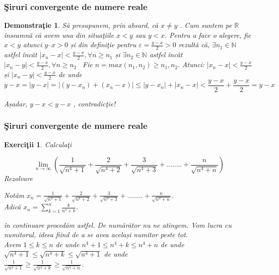 \documentclass{beamer}
\theoremstyle{plain}
\newtheorem{ex}[de]{Exerci\c tii}
\newtheorem{dem}{Demonstra\c tie}
\begin{document}
\frame
{
\frametitle{\c Siruri convergente de numere reale}

\begin{dem}
S\u a presupunem, prin absurd, c\u a \(x \neq  y\) . Cum suntem pe \(\mathbb{R}\) \^ inseamn\u a c\u a avem una din situa\c tiile \(x < y\) sau \(y < x\). Pentru a face o alegere, fie \(x < y\) atunci \(y – x > 0\) și din defini\c tie pentru \(\varepsilon = \frac{y- x}{2}  > 0\) rezult\u a c\u a, 
\(\exists  n_{1} \in \mathbb{N}\) astfel \^ inc\^ at \(\left | x_{n} - x  \right | < \frac{y - x }{2} , \forall n \geq n_{1} \)
și 
\(\exists  n_{2} \in \mathbb{N}\) astfel \^ inc\^ at \(\left | x_{n} - y  \right | < \frac{y - x }{2} , \forall n \geq n_{2}\) 
Fie \(n = max (n _{1}, n_{2}) \geq n_{1}, n_{2}.\) Atunci: 
\(\left | x_{n} - x \right | < \frac{y-x}{2}\) și \(\left | x_{n} - y  \right | <  \frac{y-x}{2}\)
de unde 
\begin{displaymath}
  y-x = \left | y-x \right | = \left | (y-x_{n})+ (x_{n} -x) \right |\leq \left | y-x_{n} \right | + \left | x_{n} - x \right | < \frac{y-x}{2} + \frac{y-x}{2} = y-x
\end{displaymath}

	Așadar, \(y-x < y-x\) , contradic\c tie!
\end{dem}
}
\frame
{
\frametitle{\c Siruri convergente de numere reale}

\begin{ex}
Calcula\c ti 

\begin{displaymath}
  \lim_{n\to\infty }\left ( \frac{1}{\sqrt{n^{4}+1}}+ \frac{2}{\sqrt{n^{4}+2} } +\frac{3}{\sqrt{n^{4}+3}}+........+\frac{n}{\sqrt{n^{4}+n}}  \right )
\end{displaymath}
Rezolvare

Not\u am \(x_{n}= \frac{1}{\sqrt{n^{4}+1}} + \frac{2}{\sqrt{n^{4}+2}}+\frac{3}{\sqrt{n^{4}+3}}+........+\frac{n}{\sqrt{n^{4}+n}}\).
\\ Adic\u a \(x_{n}= \sum_{k=1}^{n}\frac{k}{n^{4}+k}\).

\^ in continuare proced\u am astfel. De num\u ar\u ator nu ne atingem. Vom lucra cu numitorul, ideea fiind de a se avea același numitor peste tot. 
\\ Avem \(1\leq k\leq n\) de unde \(n^{4}+1 \leq n^{4}+k \leq n^{4}+n\) de unde\\  \(\sqrt{n^{4}+1}\leq \sqrt{n^{4}+k}\leq \sqrt{n^{4}+1}\) de unde \\ \(\frac{1}{\sqrt{n^{4}+1}}\geq \frac{1}{\sqrt{n^{4}+k}}\geq \frac{1}{\sqrt{n^{4}+n}}\).
\end{ex}

}
\end{document}
